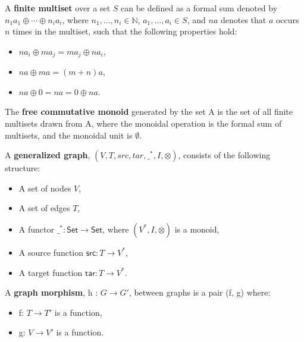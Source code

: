 
\begin{definition}
  \label{def:Finite-Multiset}
  A \textbf{finite multiset} over a set $S$ can be defined as a formal
  sum denoted by $n_1a_1 \oplus \cdots \oplus n_ia_i$, where $n_1,
  \ldots, n_i \in \mathbb{N}$, $a_1, \ldots, a_i \in S$, and $na$
  denotes that $a$ occurs $n$ times in the multiset, such that the
  following properties hold:
  \begin{itemize}    
  \item $na_i \oplus ma_j = ma_j \oplus na_i$,
  \item $na \oplus ma = (m+n)a$,
  \item $na \oplus 0 = na = 0 \oplus na$.
  \end{itemize}
\end{definition}
%
\begin{definition}
  \label{def:Free-Commutative-Monoid}  
  The \textbf{free commutative monoid} generated by the set A is the
  set of all finite multisets drawn from A, where the monoidal
  operation is the formal sum of multisets, and the monoidal unit is
  $\emptyset$.
\end{definition}
%
\begin{definition}
  \label{def:Graph}
  A \textbf{generalized graph}, $(V, T, src, tar, \_^*,I,\otimes)$, consists of the following structure:  
  \begin{itemize}
  \item A set of nodes $V$,
  \item A set of edges $T$,
  \item A functor $\_^* : \mathsf{Set} \to \mathsf{Set}$, where
    $(V^*,I,\otimes)$ is a monoid,
  \item A source function $\mathsf{src} : T \to V^*$,
  \item A target function $\mathsf{tar} : T \to V^*$.
  \end{itemize}
\end{definition}
%
\begin{definition}
  \label{def:Graph-Morphism}
  A \textbf{graph morphism}, h : $G \to G'$, between graphs is a pair (f, g) where:
  \begin{itemize}
  \item f: $T \to T'$ is a function,
  \item g: $V \to V'$ is a function.
  \end{itemize}
\end{definition}

